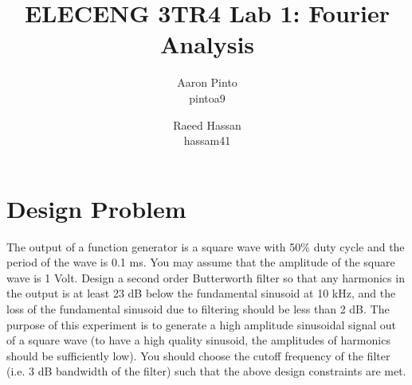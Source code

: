 \documentclass[12pt]{article}
\title{ELECENG 3TR4 Lab 1: Fourier Analysis}
\author{
    Aaron Pinto \\ pintoa9
    \and
    Raeed Hassan \\ hassam41
}
\begin{document}
\maketitle
\clearpage

\section*{Design Problem}
The output of a function generator is a square wave with 50\% duty cycle and the period of the wave is 0.1 ms. You may assume that the amplitude of the square wave is 1 Volt. Design a second order Butterworth filter so that any harmonics in the output is at least 23 dB below the fundamental sinusoid at 10 kHz, and the loss of the fundamental sinusoid due to filtering should be less than 2 dB. The purpose of this experiment is to generate a high amplitude sinusoidal signal out of a square wave (to have a high quality sinusoid, the amplitudes of harmonics should be sufficiently low). You should choose the cutoff frequency of the filter (i.e. 3 dB bandwidth of the filter) such that the above design constraints are met.
\end{document}
